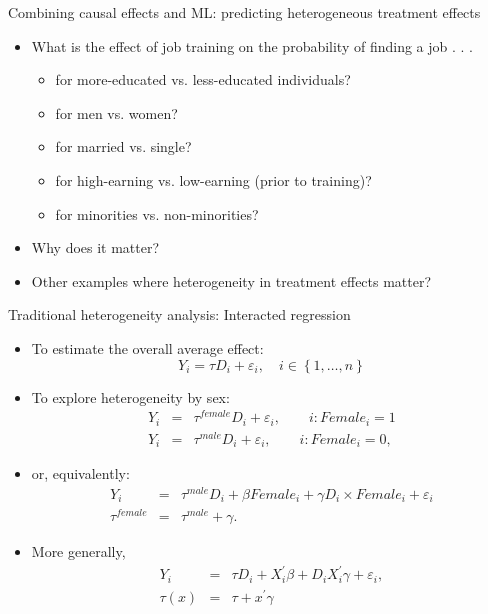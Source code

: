 \documentclass{beamer}
\newenvironment{stepitemize}{\begin{itemize}[<+->]}{\end{itemize} }
\begin{document}
\begin{frame}{Combining causal effects and ML: predicting heterogeneous treatment effects}
\begin{itemize}
	\item What is the effect of job training on the probability of finding a job . . .
\begin{itemize}
	\item for more-educated vs. less-educated individuals?
	\item for men vs. women?
	\item for married vs. single?
	\item for high-earning vs. low-earning (prior to training)?
	\item for minorities vs. non-minorities?
\end{itemize}
\item Why does it matter?
\item Other examples where heterogeneity in treatment effects matter?
\end{itemize}
\end{frame}

\begin{frame}{Traditional heterogeneity analysis: Interacted regression}
\begin{stepitemize}
\item[] To estimate the overall average effect:
\[
Y_i = \tau D_i + \varepsilon_i, \quad i\in\left\{1,\ldots,n\right\}
\]
\item[] To explore heterogeneity by sex:
\begin{eqnarray*}
Y_{i} &=&\tau ^{female}D_{i}+\varepsilon _{i},\qquad i:Female_{i}=1 \\
Y_{i} &=&\tau ^{male}D_{i}+\varepsilon _{i},\qquad i:Female_{i}=0,
\end{eqnarray*}%
\item[] or, equivalently:%
\begin{eqnarray*}
Y_{i} &=&\tau ^{male}D_{i}+\beta Female_{i}+\gamma D_{i}\times
Female_{i}+\varepsilon _{i}  \\
\tau ^{female} &=&\tau ^{male}+\gamma .
\end{eqnarray*}%
\item[] More generally,%
\begin{eqnarray*}
Y_{i} &=&\tau D_{i}+X_{i}^{\prime }\beta +D_{i}X_{i}^{\prime }\gamma
+\varepsilon _{i}, \\
\tau\left( x\right)  &=&\tau +x^{\prime }\gamma 
\end{eqnarray*}
\end{stepitemize}
\end{frame}
\end{document}
